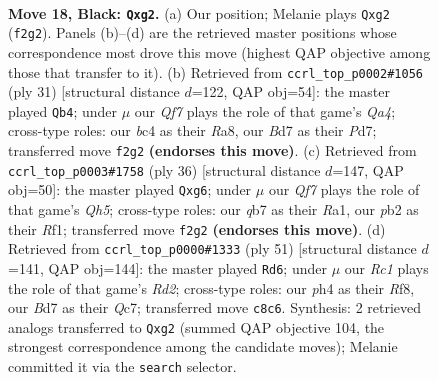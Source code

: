 \documentclass[11pt]{article}
\begin{document}
\clearpage

\begin{figure}[p]\centering
\begin{subfigure}{0.46\textwidth}\centering
\resizebox{\linewidth}{!}{%
\newchessgame
\chessboard[
  setfen={rnr3k1/pQ1b1ppp/4p3/8/2B1P2P/4nN2/PP1N1qP1/R1K4R b - - 2 18},
  showmover=false,
  pgfstyle=straightmove, color=movearrow, markmove={f2-g2}
]}
\caption{}
\end{subfigure}\hfill
\begin{subfigure}{0.46\textwidth}\centering
\resizebox{\linewidth}{!}{%
\newchessgame
\chessboard[
  setfen={rn1r2k1/3p1ppp/b2Qp3/qBp5/P3P3/2N5/1P3PPP/R3R1K1 b - - 0 16},
  showmover=false,
  pgfstyle=straightmove, color=movearrow, markmove={a5-b4}
]}
\caption{}
\end{subfigure}
\\[4pt]
\begin{subfigure}{0.46\textwidth}\centering
\resizebox{\linewidth}{!}{%
\newchessgame
\chessboard[
  setfen={r5kr/pp4p1/4bqnp/2Ppp2Q/5P1N/P1n1B3/2P3PP/R4RK1 w - - 0 19},
  showmover=false,
  pgfstyle=straightmove, color=movearrow, markmove={h5-g6}
]}
\caption{}
\end{subfigure}\hfill
\begin{subfigure}{0.46\textwidth}\centering
\resizebox{\linewidth}{!}{%
\newchessgame
\chessboard[
  setfen={5r1k/2qrb2p/p3Qpp1/1p3n2/3B1P2/P6P/1PP1N1P1/3R1R1K b - - 2 26},
  showmover=false,
  pgfstyle=straightmove, color=movearrow, markmove={d7-d6}
]}
\caption{}
\end{subfigure}
\caption{\textbf{Move 18, Black: \texttt{Qxg2}.} (a) Our position; Melanie plays \texttt{Qxg2} (\texttt{f2g2}). Panels (b)--(d) are the retrieved master positions whose correspondence most drove this move (highest QAP objective among those that transfer to it). (b) Retrieved from \texttt{ccrl\_top\_p0002\#1056} (ply 31) [structural distance $d$=122, QAP obj=54]: the master played \texttt{Qb4}; under $\mu$ our \emph{Qf7} plays the role of that game's \emph{Qa4}; cross-type roles: our \emph{b}c4 as their \emph{R}a8, our \emph{B}d7 as their \emph{P}d7; transferred move \texttt{f2g2} \textbf{(endorses this move)}. (c) Retrieved from \texttt{ccrl\_top\_p0003\#1758} (ply 36) [structural distance $d$=147, QAP obj=50]: the master played \texttt{Qxg6}; under $\mu$ our \emph{Qf7} plays the role of that game's \emph{Qh5}; cross-type roles: our \emph{q}b7 as their \emph{R}a1, our \emph{p}b2 as their \emph{R}f1; transferred move \texttt{f2g2} \textbf{(endorses this move)}. (d) Retrieved from \texttt{ccrl\_top\_p0000\#1333} (ply 51) [structural distance $d$=141, QAP obj=144]: the master played \texttt{Rd6}; under $\mu$ our \emph{Rc1} plays the role of that game's \emph{Rd2}; cross-type roles: our \emph{p}h4 as their \emph{R}f8, our \emph{B}d7 as their \emph{Q}c7; transferred move \texttt{c8c6}. Synthesis: 2 retrieved analogs transferred to \texttt{Qxg2} (summed QAP objective 104, the strongest correspondence among the candidate moves); Melanie committed it via the \texttt{search} selector.}
\label{fig:thought-m35}
\end{figure}
\end{document}
